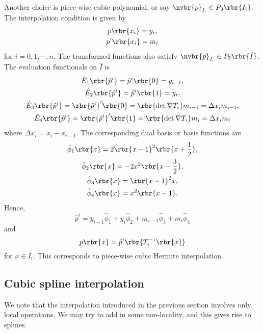 \documentclass[english, nochinese]{pnote}
\begin{document}
Another choice is piece-wise cubic polynomial, or say $ \nvbr{p}_{I_i} \in P_3 \rbr{I_i} $. The interpolation condition is given by
\begin{gather}
p \rbr{x_i} = y_i, \\
p' \rbr{x_i} = m_i
\end{gather}
for $ i = 0, 1, \cdots, n $. The transformed functions also satisfy $ \nvbr{\hat{p}}_{I_i} \in P_3 \rbr{\hat{I}} $. The evaluation functionals on $\hat{I}$ is
\begin{gather}
\hat{E}_1 \rbr{\hat{p}^i} = \hat{p}^i \rbr{0} = y_{ i - 1 }, \\
\hat{E}_2 \rbr{\hat{p}^i} = \hat{p}^i \rbr{1} = y_i, \\
\hat{E}_3 \rbr{\hat{p}^i} = \rbr{\hat{p}^i}' \rbr{0} = \rbr{ \det \nabla T_i } m_{ i - 1 } = \Delta x_i m_{ i - 1 }, \\
\hat{E}_4 \rbr{\hat{p}^i} = \rbr{\hat{p}^i}' \rbr{1} = \rbr{ \det \nabla T_i } m_i = \Delta x_i m_i
\end{gather}
where $ \Delta x_i = x_i - x_{ i - 1 } $. The corresponding dual basis or basis functions are
\begin{gather}
\hat{\phi}_1 \rbr{x} = 2 \rbr{ x - 1 }^2 \rbr{ x + \frac{1}{2} }, \\
\hat{\phi}_2 \rbr{x} = -2 x^2 \rbr{ x - \frac{3}{2} }, \\
\hat{\phi}_3 \rbr{x} = \rbr{ x - 1 }^2 x, \\
\hat{\phi}_4 \rbr{x} = x^2 \rbr{ x - 1 }.
\end{gather}
Hence,
\begin{equation}
\hat{p}^i = y_{ i - 1 } \hat{\phi}_1 + y_i \hat{\phi}_2 + m_{ i - 1 } \hat{\phi}_3 + m_i \hat{\phi}_4
\end{equation}
and
\begin{equation}
p \rbr{x} = \hat{p}^i \rbr{T_i^{-1} \rbr{x} }
\end{equation}
for $ x \in I_i $. This corresponds to piece-wise cubic Hermite interpolation.

\subsection{Cubic spline interpolation}

We note that the interpolation introduced in the previous section involves only local operations. We may try to add in some non-locality, and this gives rise to splines.
\end{document}
